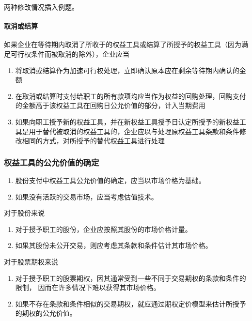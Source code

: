 \documentclass[UTF8,12pt]{ctexart}
\numberwithin{equation}{section} %
\numberwithin{figure}{section}
\numberwithin{table}{section}
\begin{document}
	两种修改情况插入例题。
	
	\paragraph{取消或结算}
	如果企业在等待期内取消了所收于的权益工具或结算了所授予的权益工具（因为满足可行权条件而被取消的除外），企业应当
	\begin{enumerate}
		\item 将取消或结算作为加速可行权处理，立即确认原本应在剩余等待期内确认的金额
		
		\item 在取消或结算时支付给职工的所有款项均应当作为权益的回购处理，回购支付的金额高于该权益工具在回购日公允价值的部分，计入当期费用
		
		\item 如果向职工授予新的权益工具，并在新权益工具授予日认定所授予的新权益工具是用于替代被取消的权益工具的，企业应以与处理原权益工具条款和条件修改相同的方式，对所授予的替代权益工具进行处理
	\end{enumerate}
	
	
	\subsubsection{权益工具的公允价值的确定}
	\begin{enumerate}
		\item 股份支付中权益工具公允价值的确定，应当以市场价格为基础。
		
		\item 如果没有活跃的交易市场，应当考虑估值技术。
	\end{enumerate}
	
	对于股份来说
	\begin{enumerate}
		\item 对于授予职工的股份，企业应按照其股份的市场价格计量。
		
		\item 如果其股份未公开交易，则应考虑其条款和条件估计其市场价格。
		
	\end{enumerate}
	
	对于股票期权来说
	\begin{enumerate}
		\item 对于授予职工的股票期权，因其通常受到一些不同于交易期权的条款和条件的限制， 因而在许多情况下难以获得其市场价格。
		
		\item 如果不存在条款和条件相似的交易期权，就应通过期权定价模型来估计所授予的期权的公允价值。
	\end{enumerate}
\end{document}
